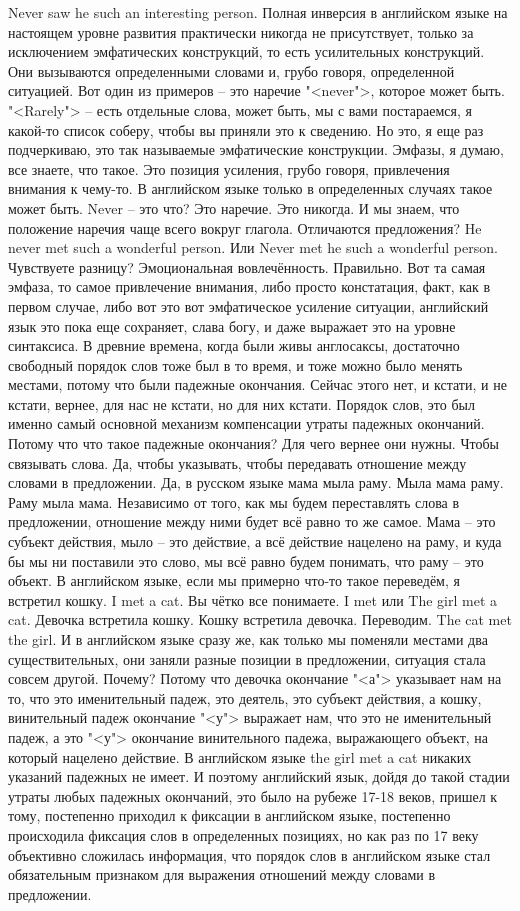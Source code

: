 \documentclass[main.tex]{subfiles}
\begin{document}
Never saw he such an interesting person.
Полная инверсия в английском языке на настоящем уровне развития практически никогда не присутствует, только за исключением эмфатических конструкций, то есть усилительных конструкций.
Они вызываются определенными словами и, грубо говоря, определенной ситуацией.
Вот один из примеров -- это наречие "<never">, которое может быть.
"<Rarely"> -- есть отдельные слова, может быть, мы с вами постараемся, я какой-то список соберу, чтобы вы приняли это к сведению.
Но это, я еще раз подчеркиваю, это так называемые эмфатические конструкции.
Эмфазы, я думаю, все знаете, что такое.
Это позиция усиления, грубо говоря, привлечения внимания к чему-то.
В английском языке только в определенных случаях такое может быть.
Never -- это что?
Это наречие.
Это никогда.
И мы знаем, что положение наречия чаще всего вокруг глагола.
Отличаются предложения?
He never met such a wonderful person.
Или Never met he such a wonderful person.
Чувствуете разницу? Эмоциональная вовлечённость.
Правильно.
Вот та самая эмфаза, то самое привлечение внимания, либо просто констатация, факт, как в первом случае, либо вот это вот эмфатическое усиление ситуации, английский язык это пока еще сохраняет, слава богу, и даже выражает это на уровне синтаксиса.
В древние времена, когда были живы англосаксы, достаточно свободный порядок слов тоже был в то время, и тоже можно было менять местами, потому что были падежные окончания.
Сейчас этого нет, и кстати, и не кстати, вернее, для нас не кстати, но для них кстати.
Порядок слов, это был именно самый основной механизм компенсации утраты падежных окончаний.
Потому что что такое падежные окончания? Для чего вернее они нужны.
Чтобы связывать слова.
Да, чтобы указывать, чтобы передавать отношение между словами в предложении.
Да, в русском языке мама мыла раму.
Мыла мама раму.
Раму мыла мама.
Независимо от того, как мы будем переставлять слова в предложении, отношение между ними будет всё равно то же самое.
Мама -- это субъект действия, мыло -- это действие, а всё действие нацелено на раму, и куда бы мы ни поставили это слово, мы всё равно будем понимать, что раму -- это объект.
В английском языке, если мы примерно что-то такое переведём, я встретил кошку.
I met a cat.
Вы чётко все понимаете.
I met или The girl met a cat.
Девочка встретила кошку.
Кошку встретила девочка.
Переводим.
The cat met the girl.
И в английском языке сразу же, как только мы поменяли местами два существительных, они заняли разные позиции в предложении, ситуация стала совсем другой.
Почему?
Потому что девочка окончание "<а"> указывает нам на то, что это именительный падеж, это деятель, это субъект действия, а кошку, винительный падеж окончание "<у"> выражает нам, что это не именительный падеж, а это "<у"> окончание винительного падежа, выражающего объект, на который нацелено действие.
В английском языке the girl met a cat никаких указаний падежных не имеет.
И поэтому английский язык, дойдя до такой стадии утраты любых падежных окончаний, это было на рубеже 17-18 веков, пришел к тому, постепенно приходил к фиксации в английском языке, постепенно происходила фиксация слов в определенных позициях, но как раз по 17 веку объективно сложилась информация, что порядок слов в английском языке стал обязательным признаком для выражения отношений между словами в предложении.
\end{document}
